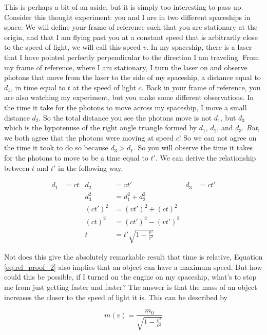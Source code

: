 This is perhaps a bit of an aside, but it is simply too interesting to pass up. Consider this thought experiment: you and I are in two different spaceships in space. We will define your frame of reference such that you are stationary at the origin, and that I am flying past you at a constant speed that is arbitrarily close to the speed of light, we will call this speed $v$. In my spaceship, there is a laser that I have pointed perfectly perpendicular to the direction I am traveling. From my frame of reference, where I am stationary, I turn the laser on and observe photons that move from the laser to the side of my spaceship, a distance equal to $d_{1}$, in time equal to $t$ at the speed of light $c$. Back in your frame of reference, you are also watching my experiment, but you make some different observations. In the time it take for the photons to move across my spaceship, I move a small distance $d_{2}$. So the total distance you see the photons move is not $d_{1}$, but $d_{3}$ which is the hypotenuse of the right angle triangle formed by $d_{1}$, $d_{2}$, and $d_{3}$. \textit{But}, we both agree that the photons were moving at speed $c$! So we can not agree on the time it took to do so because $d_{3} > d_{1}$. So you will observe the time it takes for the photons to move to be a time equal to $t'$. We can derive the relationship between $t$ and $t'$ in the following way.

\begin{align}
\label{eq:rel_proof}
d_{1} &	= ct	&	d_{2} &	= vt'	&	d_{3} &	=ct'	\\
&&	d_{3}^{2}	&	=d_{1}^{2}+d_{2}^{2}		\\
&&	(ct')^{2}	&	=(vt')^{2} + (ct)^{2}	\\
&&	(ct)^{2}	&	=(ct')^{2} - (vt')^{2}	\\
&&	t	&	=t'\sqrt{1 - \frac{v^{2}}{c^{2}}}
\label{eq:rel_proof_2}
\end{align} 

Not does this give the absolutely remarkable result that time is relative, Equation \ref{eq:rel_proof_2} also implies that an object can have a maximum speed. But how could this be possible, if I turned on the engine on my spaceship, what's to stop me from just getting faster and faster? The answer is that the mass of an object increases the closer to the speed of light it is. This can be described by\cite{Piela}
 
\begin{equation}
\label{eq:rel_mass}
m(v) = \frac{m_{0}}{\sqrt{1 - \frac{v^{2}}{c^{2}}}}
\end{equation}

